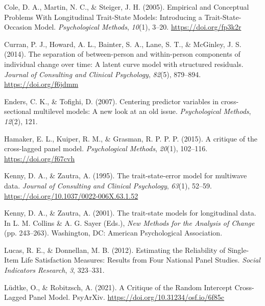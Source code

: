 \documentclass[
  english,
  man,floatsintext]{apa6}
\newlength{\cslhangindent}
\newlength{\cslentryspacingunit} %
\newenvironment{CSLReferences}[2] %
 {%
  \setlength{\parindent}{0pt}
  \ifodd #1
  \let\oldpar\par
  \def\par{\hangindent=\cslhangindent\oldpar}
  \fi
  \setlength{\parskip}{#2\cslentryspacingunit}
 }%
 {}
\begin{document}
\hypertarget{refs}{}
\begin{CSLReferences}{1}{0}
\leavevmode{}%
Cole, D. A., Martin, N. C., \& Steiger, J. H. (2005). Empirical and {Conceptual Problems With Longitudinal Trait}-{State Models}: {Introducing} a {Trait}-{State}-{Occasion Model}. \emph{Psychological Methods}, \emph{10}(1), 3--20. \url{https://doi.org/fp3k2r}

\leavevmode{}%
Curran, P. J., Howard, A. L., Bainter, S. A., Lane, S. T., \& McGinley, J. S. (2014). The separation of between-person and within-person components of individual change over time: {A} latent curve model with structured residuals. \emph{Journal of Consulting and Clinical Psychology}, \emph{82}(5), 879--894. \url{https://doi.org/f6jdmm}

\leavevmode{}%
Enders, C. K., \& Tofighi, D. (2007). Centering predictor variables in cross-sectional multilevel models: {A} new look at an old issue. \emph{Psychological Methods}, \emph{12}(2), 121.

\leavevmode{}%
Hamaker, E. L., Kuiper, R. M., \& Grasman, R. P. P. P. (2015). A critique of the cross-lagged panel model. \emph{Psychological Methods}, \emph{20}(1), 102--116. \url{https://doi.org/f67cvh}

\leavevmode{}%
Kenny, D. A., \& Zautra, A. (1995). The trait-state-error model for multiwave data. \emph{Journal of Consulting and Clinical Psychology}, \emph{63}(1), 52--59. \url{https://doi.org/10.1037/0022-006X.63.1.52}

\leavevmode{}%
Kenny, D. A., \& Zautra, A. (2001). The trait-state models for longitudinal data. In L. M. Collins \& A. G. Sayer (Eds.), \emph{New {Methods} for the {Analysis} of {Change}} (pp. 243--263). {Washington, DC}: {American Psychological Association}.

\leavevmode{}%
Lucas, R. E., \& Donnellan, M. B. (2012). Estimating the {Reliability} of {Single}-{Item Life Satisfaction Measures}: {Results} from {Four National Panel Studies}. \emph{Social Indicators Research}, \emph{3}, 323--331.

\leavevmode{}%
Lüdtke, O., \& Robitzsch, A. (2021). A {Critique} of the {Random Intercept Cross}-{Lagged Panel Model}. {PsyArXiv}. \url{https://doi.org/10.31234/osf.io/6f85c}


\end{CSLReferences}
\end{document}
